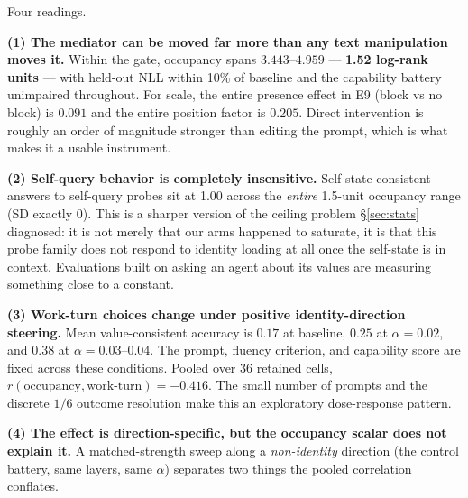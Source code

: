 \documentclass{article}
\begin{document}
Four readings.

\textbf{(1) The mediator can be moved far more than any text manipulation moves it.} Within the gate, occupancy spans $3.443$--$4.959$ --- \textbf{1.52 log-rank units} --- with held-out NLL within 10\% of baseline and the capability battery unimpaired throughout. For scale, the entire presence effect in E9 (block vs no block) is $0.091$ and the entire position factor is $0.205$. Direct intervention is roughly an order of magnitude stronger than editing the prompt, which is what makes it a usable instrument.

\textbf{(2) Self-query behavior is completely insensitive.} Self-state-consistent answers to self-query probes sit at 1.00 across the \emph{entire} 1.5-unit occupancy range (SD exactly 0). This is a sharper version of the ceiling problem \S\ref{sec:stats} diagnosed: it is not merely that our arms happened to saturate, it is that this probe family does not respond to identity loading at all once the self-state is in context. Evaluations built on asking an agent about its values are measuring something close to a constant.

\textbf{(3) Work-turn choices change under positive identity-direction steering.} Mean value-consistent accuracy is $0.17$ at baseline, $0.25$ at $\alpha{=}0.02$, and $0.38$ at $\alpha{=}0.03$--$0.04$. The prompt, fluency criterion, and capability score are fixed across these conditions. Pooled over 36 retained cells, $r(\text{occupancy}, \text{work-turn})=-0.416$. The small number of prompts and the discrete $1/6$ outcome resolution make this an exploratory dose-response pattern.

\textbf{(4) The effect is direction-specific, but the occupancy scalar does not explain it.} A matched-strength sweep along a \emph{non-identity} direction (the control battery, same layers, same $\alpha$) separates two things the pooled correlation conflates.
\end{document}
